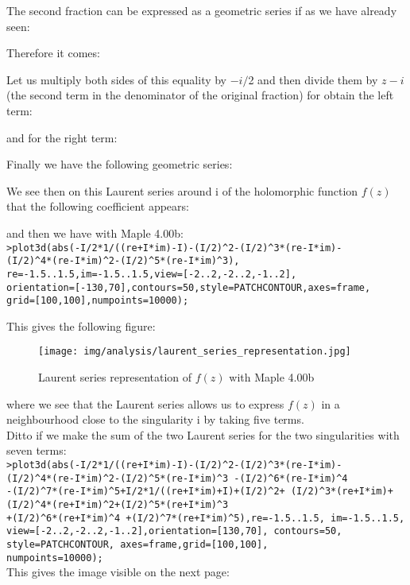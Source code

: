 	\pagebreak
	\begin{tcolorbox}[colframe=black,colback=white,sharp corners]
	The second fraction can be expressed as a geometric series if as we have already seen:
	
	Therefore it comes:
	
	Let us multiply both sides of this equality by $-i / $2 and then divide them by $z - i$ (the second term in the denominator of the original fraction) for obtain the left term:
	
	and for the right term:
	
	Finally we have the following geometric series:
	
	We see then on this Laurent series around $\mathrm{i}$ of the holomorphic function $f(z)$ that the following coefficient appears:
	
	and then we have with Maple 4.00b:\\
	
	\texttt{>plot3d(abs(-I/2*1/((re+I*im)-I)-(I/2)\string^2-(I/2)\string^3*(re-I*im)-\\
	(I/2)\string^4*(re-I*im)\string^2-(I/2)\string^5*(re-I*im)\string^3),\\
	re=-1.5..1.5,im=-1.5..1.5,view=[-2..2,-2..2,-1..2],\\
	orientation=[-130,70],contours=50,style=PATCHCONTOUR,axes=frame,\\
	grid=[100,100],numpoints=10000);}
	\end{tcolorbox}
	
	\pagebreak
	\begin{tcolorbox}[colframe=black,colback=white,sharp corners]
	This gives the following figure:
	\begin{figure}[H]
		\centering
		\texttt{[image: img/analysis/laurent\_series\_representation.jpg]}
		\caption{Laurent series representation of $f(z)$ with Maple 4.00b}
	\end{figure}
	where we see that the Laurent series allows us to express $f (z)$ in a neighbourhood close to the singularity $\mathrm{i}$ by taking five terms.\\
	
	Ditto if we make the sum of the two Laurent series for the two singularities with seven terms:\\
	
	\texttt{>plot3d(abs(-I/2*1/((re+I*im)-I)-(I/2)\string^2-(I/2)\string^3*(re-I*im)-\\
	(I/2)\string^4*(re-I*im)\string^2-(I/2)\string^5*(re-I*im)\string^3 -(I/2)\string^6*(re-I*im)\string^4\\
	-(I/2)\string^7*(re-I*im)\string^5+I/2*1/((re+I*im)+I)+(I/2)\string^2+
(I/2)\string^3*(re+I*im)+(I/2)\string^4*(re+I*im)\string^2+(I/2)\string^5*(re+I*im)\string^3\\
	+(I/2)\string^6*(re+I*im)\string^4
+(I/2)\string^7*(re+I*im)\string^5),re=-1.5..1.5, im=-1.5..1.5, view=[-2..2,-2..2,-1..2],orientation=[130,70], contours=50, style=PATCHCONTOUR, axes=frame,grid=[100,100],\\
numpoints=10000);}\\

	This gives the image visible on the next page:
	\end{tcolorbox}
	
